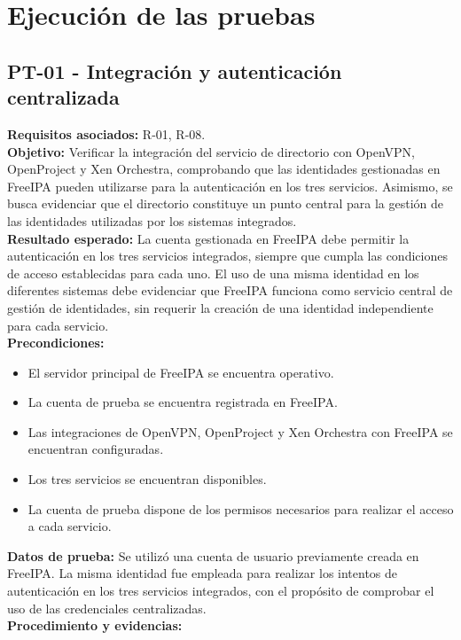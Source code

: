 \section{Ejecución de las pruebas}\label{sec:ejecucion-pruebas}

\subsection{PT-01 - Integración y autenticación centralizada}\label{subsec:pt01}
\textbf{Requisitos asociados:} R-01, R-08.\\
\textbf{Objetivo:} Verificar la integración del servicio de directorio con OpenVPN, OpenProject y Xen Orchestra, comprobando que las identidades gestionadas en FreeIPA pueden utilizarse para la autenticación en los tres servicios. Asimismo, se busca evidenciar que el directorio constituye un punto central para la gestión de las identidades utilizadas por los sistemas integrados.\\
\textbf{Resultado esperado:} La cuenta gestionada en FreeIPA debe permitir la autenticación en los tres servicios integrados, siempre que cumpla las condiciones de acceso establecidas para cada uno. El uso de una misma identidad en los diferentes sistemas debe evidenciar que FreeIPA funciona como servicio central de gestión de identidades, sin requerir la creación de una identidad independiente para cada servicio.\\
\textbf{Precondiciones:}
\begin{itemize}
	\item El servidor principal de FreeIPA se encuentra operativo.
	\item La cuenta de prueba se encuentra registrada en FreeIPA.
	\item Las integraciones de OpenVPN, OpenProject y Xen Orchestra con FreeIPA se encuentran configuradas.
	\item Los tres servicios se encuentran disponibles.
	\item La cuenta de prueba dispone de los permisos necesarios para realizar el acceso a cada servicio.
\end{itemize}
\textbf{Datos de prueba:} Se utilizó una cuenta de usuario previamente creada en FreeIPA. La misma identidad fue empleada para realizar los intentos de autenticación en los tres servicios integrados, con el propósito de comprobar el uso de las credenciales centralizadas.\\
\textbf{Procedimiento y evidencias:}
